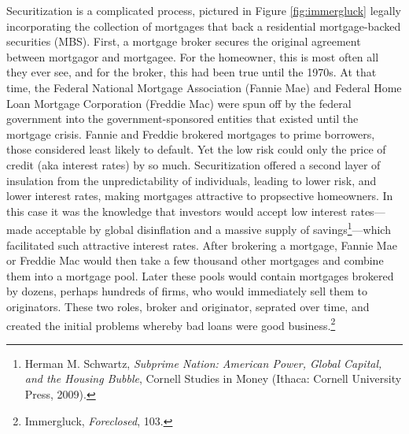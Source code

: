 \documentclass[12pt,oneside]{psthesis}
\begin{document}
Securitization is a complicated process, pictured in Figure \ref{fig:immergluck} legally incorporating the collection of mortgages that back a residential mortgage-backed securities (MBS).
First, a mortgage broker secures the original agreement between mortgagor and mortgagee.
For the homeowner, this is most often all they ever see, and for the broker, this had been true until the 1970s.
At that time, the Federal National Mortgage Association (Fannie Mae) and Federal Home Loan Mortgage Corporation (Freddie Mac) were spun off by the federal government into the government-sponsored entities that existed until the mortgage crisis.
Fannie and Freddie brokered mortgages to prime borrowers, those considered least likely to default.
Yet the low risk could only the price of credit (aka interest rates) by so much.
Securitization offered a second layer of insulation from the unpredictability of individuals, leading to lower risk, and lower interest rates, making mortgages attractive to propsective homeowners.
In this case it was the knowledge that investors would accept low interest rates---made acceptable by global disinflation and a massive supply of savings\footnote{Herman M. Schwartz, \emph{Subprime Nation: American Power, Global Capital, and the Housing Bubble}, Cornell Studies in Money (Ithaca: Cornell University Press, 2009).}---which facilitated such attractive interest rates.
After brokering a mortgage, Fannie Mae or Freddie Mac would then take a few thousand other mortgages and combine them into a mortgage pool.
Later these pools would contain mortgages brokered by dozens, perhaps hundreds of firms, who would immediately sell them to originators.
These two roles, broker and originator, seprated over time, and created the initial problems whereby bad loans were good business.\footnote{Immergluck, \emph{Foreclosed}, 103.}
\end{document}
